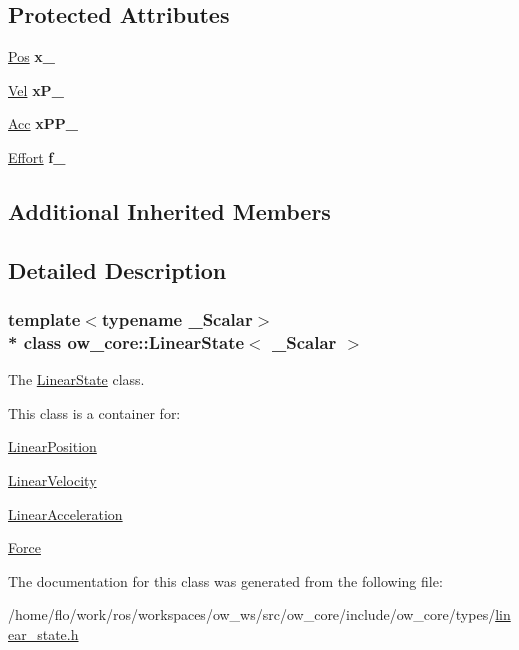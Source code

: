 \subsection*{Protected Attributes}
\begin{DoxyCompactItemize}
\item 
\hyperlink{classow__core_1_1LinearPosition}{Pos} {\bfseries x\+\_\+}\hypertarget{classow__core_1_1LinearState_a65803caab3f59c4eac3c1f6a68e30320}{}\label{classow__core_1_1LinearState_a65803caab3f59c4eac3c1f6a68e30320}

\item 
\hyperlink{classow__core_1_1LinearVelocity}{Vel} {\bfseries x\+P\+\_\+}\hypertarget{classow__core_1_1LinearState_a77b8c30f6545c4b91c01c1eeb391cd22}{}\label{classow__core_1_1LinearState_a77b8c30f6545c4b91c01c1eeb391cd22}

\item 
\hyperlink{classow__core_1_1LinearAcceleration}{Acc} {\bfseries x\+P\+P\+\_\+}\hypertarget{classow__core_1_1LinearState_a68a76a3b4f98a3229b4d86366bec561a}{}\label{classow__core_1_1LinearState_a68a76a3b4f98a3229b4d86366bec561a}

\item 
\hyperlink{classow__core_1_1Force}{Effort} {\bfseries f\+\_\+}\hypertarget{classow__core_1_1LinearState_a25f29e3515853104e6dbe7642a5100ac}{}\label{classow__core_1_1LinearState_a25f29e3515853104e6dbe7642a5100ac}

\end{DoxyCompactItemize}
\subsection*{Additional Inherited Members}


\subsection{Detailed Description}
\subsubsection*{template$<$typename \+\_\+\+Scalar$>$\\*
class ow\+\_\+core\+::\+Linear\+State$<$ \+\_\+\+Scalar $>$}

The \hyperlink{classow__core_1_1LinearState}{Linear\+State} class. 

This class is a container for\+:
\begin{DoxyItemize}
\item \hyperlink{classow__core_1_1LinearPosition}{Linear\+Position}
\item \hyperlink{classow__core_1_1LinearVelocity}{Linear\+Velocity}
\item \hyperlink{classow__core_1_1LinearAcceleration}{Linear\+Acceleration}
\item \hyperlink{classow__core_1_1Force}{Force} 
\end{DoxyItemize}

The documentation for this class was generated from the following file\+:\begin{DoxyCompactItemize}
\item 
/home/flo/work/ros/workspaces/ow\+\_\+ws/src/ow\+\_\+core/include/ow\+\_\+core/types/\hyperlink{linear__state_8h}{linear\+\_\+state.\+h}\end{DoxyCompactItemize}
